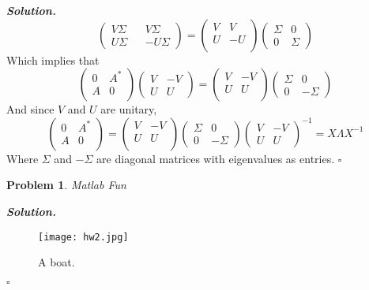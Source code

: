 \documentclass[12pt]{report}
\newtheorem{problem}{Problem}
\newenvironment{solution}[1][\it{Solution}]{\textbf{#1. } }{$\square$}
\begin{document}
\begin{solution}
$$\begin{pmatrix}
        V\Sigma&&V\Sigma\\U\Sigma&&-U\Sigma
    \end{pmatrix}=\begin{pmatrix}
        V&V\\U&-U\\
    \end{pmatrix}\begin{pmatrix}
        \Sigma&0\\0&\Sigma
    \end{pmatrix}$$
    Which implies that
    $$\begin{pmatrix}
        0&A^*\\A&0\\
    \end{pmatrix}\begin{pmatrix}
        V&-V\\U&U
    \end{pmatrix} = \begin{pmatrix}
        V&-V\\U&U\\
    \end{pmatrix}\begin{pmatrix}
        \Sigma&0\\0&-\Sigma
    \end{pmatrix}$$
    And since $V$ and $U$ are unitary,
    $$\begin{pmatrix}
        0&A^*\\A&0\\
    \end{pmatrix} = \begin{pmatrix}
        V&-V\\U&U\\
    \end{pmatrix}\begin{pmatrix}
        \Sigma&0\\0&-\Sigma
    \end{pmatrix}
    \begin{pmatrix}
        V&-V\\U&U
    \end{pmatrix}^{-1} = X \Lambda X^{-1}$$
    Where $\Sigma$ and $-\Sigma$ are diagonal matrices with eigenvalues as entries. 
\end{solution}


\begin{problem}
    Matlab Fun
\end{problem}

\begin{solution}
    \begin{figure}
        \texttt{[image: hw2.jpg]}
        \caption{A boat.}
        \label{fig:boat1}
      \end{figure}
\end{solution}
\end{document}
